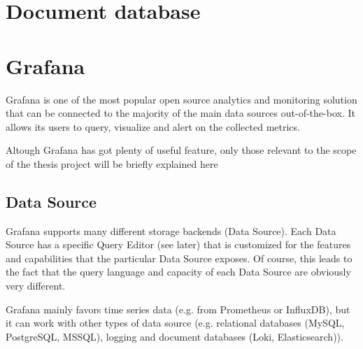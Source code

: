 \section{Document database}





\section{Grafana}

Grafana is one of the most popular open source analytics and monitoring solution that can be connected to the majority of the main data sources out-of-the-box. It allows its users to query, visualize and alert on the collected metrics. 

Altough Grafana has got plenty of useful feature, only those relevant to the scope of the thesis project will be briefly explained here


\subsection{Data Source}

Grafana supports many different storage backends (Data Source). Each Data Source has a specific Query Editor (see later) that is customized for the features and capabilities that the particular Data Source exposes. Of course, this leads to the fact that the query language and capacity of each Data Source are obviously very different.

Grafana mainly favors time series data (e.g. from Prometheus or InfluxDB), but it can work with other types of data source (e.g. relational databases (MySQL, PostgreSQL, MSSQL), logging and document databases (Loki, Elasticsearch)).

